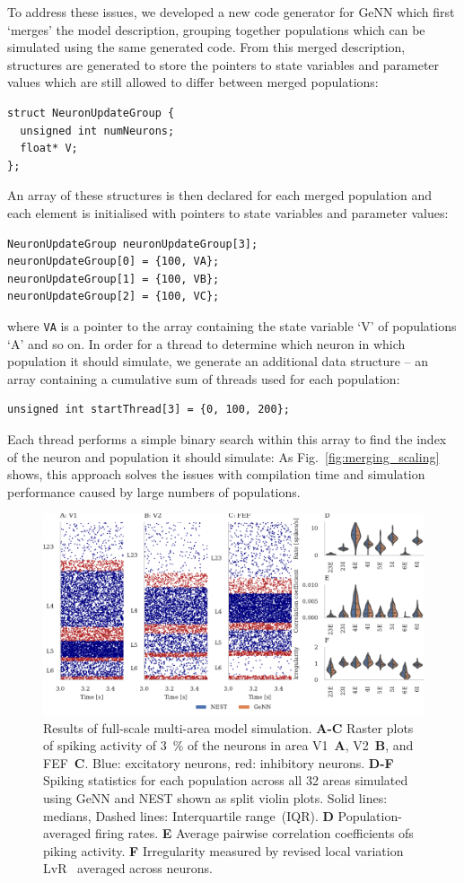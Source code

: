 \documentclass[9pt,twocolumn,twoside,lineno]{pnas-new}
\begin{document}
To address these issues, we developed a new code generator for GeNN which first `merges' the model description, grouping together populations which can be simulated using the same generated code.
From this merged description, structures are generated to store the pointers to state variables and parameter values which are still allowed to differ between merged populations:
%
\begin{lstlisting}
struct NeuronUpdateGroup {
  unsigned int numNeurons;
  float* V;
};
\end{lstlisting}
%
An array of these structures is then declared for each merged population and each element is initialised with pointers to state variables and parameter values:
%
\begin{lstlisting}
NeuronUpdateGroup neuronUpdateGroup[3];
neuronUpdateGroup[0] = {100, VA};
neuronUpdateGroup[1] = {100, VB};
neuronUpdateGroup[2] = {100, VC};
\end{lstlisting}
%
where \lstinline{VA} is a pointer to the array containing the state variable `V' of populations `A' and so on.
In order for a thread to determine which neuron in which population it should simulate, we generate an additional data structure -- an array containing a cumulative sum of threads used for each population:
\begin{lstlisting}
unsigned int startThread[3] = {0, 100, 200};
\end{lstlisting}
Each thread performs a simple binary search within this array to find the index of the neuron and population it should simulate:
As Fig.~\ref{fig:merging_scaling} shows, this approach solves the issues with compilation time and simulation performance caused by large numbers of populations.
%
\begin{figure}
    \centering
    \includegraphics{figures/multi_area}
    \caption{Results of full-scale multi-area model simulation. 
    \textbf{A-C} Raster plots of spiking activity of \SI{3}{\percent} of the neurons in area V1~\textbf{A}, V2~\textbf{B}, and FEF~\textbf{C}. 
    Blue: excitatory neurons, red: inhibitory neurons.
    \textbf{D-F} Spiking statistics for each population across all 32 areas simulated using GeNN and NEST shown as split violin plots.
    Solid lines: medians, Dashed lines: Interquartile range~(IQR).
    \textbf{D} Population-averaged firing rates.
    \textbf{E} Average pairwise correlation coefficients ofs piking activity. 
    \textbf{F} Irregularity measured by revised local variation LvR~\citep{Shinomoto2009} averaged across neurons.}
    \label{fig:multi_area}
\end{figure}
%
\end{document}
